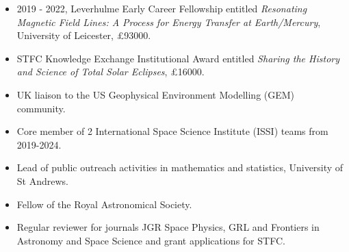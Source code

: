 \documentclass[11pt,a4paper]{article} %
\begin{document}
\begin{itemize}
\item 2019 - 2022, Leverhulme Early Career Fellowship entitled \textit{Resonating Magnetic Field Lines: A Process for Energy Transfer at Earth/Mercury}, University of Leicester, £93000. 
\vspace{-0.25cm} 
\item STFC Knowledge Exchange Institutional Award entitled \textit{Sharing the History and Science of Total Solar Eclipses}, £16000.
\vspace{-0.25cm} 
\item UK liaison to the US Geophysical Environment Modelling (GEM) community.
\vspace{-0.25cm} 
\item Core member of 2 International Space Science Institute (ISSI) teams from 2019-2024. 
\vspace{-0.25cm} 
\item Lead of public outreach activities in mathematics and statistics, University of St Andrews. 
\vspace{-0.25cm} 
\item Fellow of the Royal Astronomical Society.
\vspace{-0.25cm} 
\item Regular reviewer for journals JGR Space Physics, GRL and Frontiers in Astronomy and Space Science and grant applications for STFC.
\end{itemize}

\end{document}
